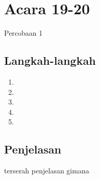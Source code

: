 \documentclass[
	12pt, %
	a4paper, %
]{fphw}
\begin{document}
\section*{Acara 19-20}

\begin{problem}
  \begin{center}
  Percobaan 1
  \end{center}
\end{problem}
\begin{center}
\end{center}

\subsection*{Langkah-langkah}

\begin{enumerate}
    \item
    \item 
    \item
    \item 
    \item 
\end{enumerate}

\subsection*{Penjelasan}
terserah penjelasan gimana
\end{document}
